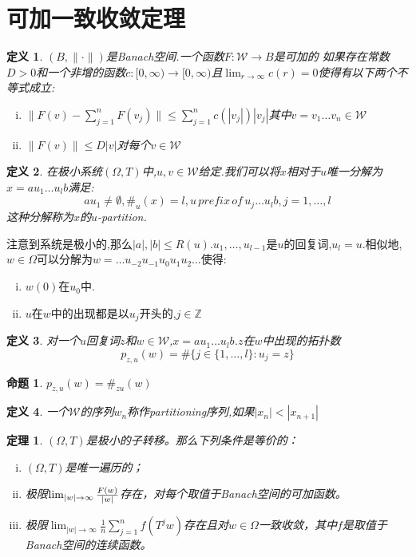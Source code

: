 \documentclass[a4paper,11pt,oneside]{book}
\newtheorem{theorem}{\textbf{\hspace{0.7cm}定理}}[section]
\newtheorem{definition}{\textbf{\hspace{0.7cm}定义}}[section]
\newtheorem{proposition}{\textbf{\hspace{0.7cm}命题}}[section]
\begin{document}
\section{可加一致收敛定理}
\begin{definition}
$(B,\|\cdot\|)$是Banach空间.一个函数$F:\mathcal{W}\rightarrow B$是可加的
如果存在常数$D>0$和一个非增的函数$c:[0,\infty)\rightarrow [0,\infty)$且$\lim_{r\to\infty}c(r)=0$使得有以下两个不等式成立:
\begin{enumerate}[(i)]
\item $\|F(v)-\sum_{j=1}^nF(v_j)\|\leq\sum_{j=1}^n c(|v_j|)|v_j|$其中$v=v_1\ldots v_n\in\mathcal{W}$
\item $\|F(v)\|\leq D|v|$对每个$v\in\mathcal{W}$
\end{enumerate}
\end{definition}

\begin{definition}
在极小系统$(\Omega,T)$中,$u,v\in\mathcal{W}$给定.我们可以将$x$相对于$u$唯一分解为$x=au_1\ldots u_lb$满足:
$$au_1\ne\emptyset,\#_u(x)=l,u\, pre\!fix\, o\!f\, u_j\ldots u_lb,j=1,\ldots,l$$
这种分解称为$x$的$u$-partition.
\end{definition}

注意到系统是极小的,那么$|a|,|b|\leq R(u)$.$u_1,\ldots,u_{l-1}$是$u$的回复词,$u_l=u$.相似地,$w\in\Omega$可以分解为$w=\ldots u_{-2}u_{-1}u_0u_1u_2\ldots$使得:
\begin{enumerate}[(i)]
\item $w(0)$在$u_0$中.
\item $u$在$w$中的出现都是以$u_j$开头的,$j\in \mathbb{Z}$
\end{enumerate}

\begin{definition}
对一个$u$回复词$z$和$w\in\mathcal{W}$,$x=au_1\ldots u_lb$.$z$在$w$中出现的拓扑数
$$p_{z,u}(w)=\#\{j\in\{1,\ldots,l\}:u_j=z\}$$
\end{definition}

\begin{proposition}
$p_{z,u}(w)=\#_{zu}(w)$
\end{proposition}

\begin{definition}
一个$\mathcal{W}$的序列${w_n}$称作partitioning序列,如果$|x_n|<|x_{n+1}|$
\end{definition}
\begin{theorem}
$(\Omega,T)$是极小的子转移。那么下列条件是等价的：
\begin{enumerate}[(i)]
\item $(\Omega,T)$是唯一遍历的；
\item 极限$\lim_{|w|\to \infty}{F(w)\over |w|}$存在，对每个取值于Banach空间的可加函数。
\item 极限$\lim_{|w|\to \infty}\frac{1}{n}\sum_{j=1}^n{f(T^jw)}$存在且对$w\in \Omega$一致收敛，其中$f$是取值于Banach空间的连续函数。
\end{enumerate}
\end{theorem}
\end{document}
